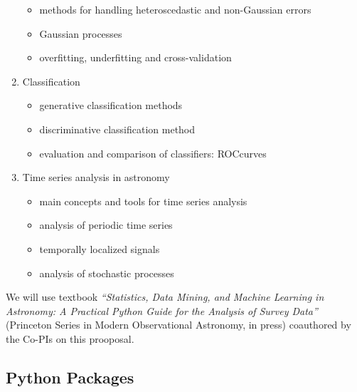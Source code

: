 \begin{enumerate}
\begin{itemize}
\item  methods for handling heteroscedastic and non-Gaussian errors 
\item  Gaussian processes
\item  overfitting, underfitting and cross-validation
\end{itemize} 
\item Classification 
\begin{itemize}
\item  generative classification methods
\item  discriminative classification method 
\item  evaluation and comparison of classifiers: ROCcurves 
\end{itemize} 
\item Time series analysis in astronomy
\begin{itemize}
\item  main concepts and tools for time series analysis
\item  analysis of periodic time series 
\item  temporally localized signals
\item  analysis of stochastic processes
\end{itemize} 
\end{enumerate} 


We will use textbook {\it ``Statistics, Data Mining, and Machine Learning in Astronomy:
A Practical Python Guide for the Analysis of Survey Data''} (Princeton Series in Modern 
Observational Astronomy, in press) coauthored by the Co-PIs on this prooposal. 



\subsection{Python Packages} 


